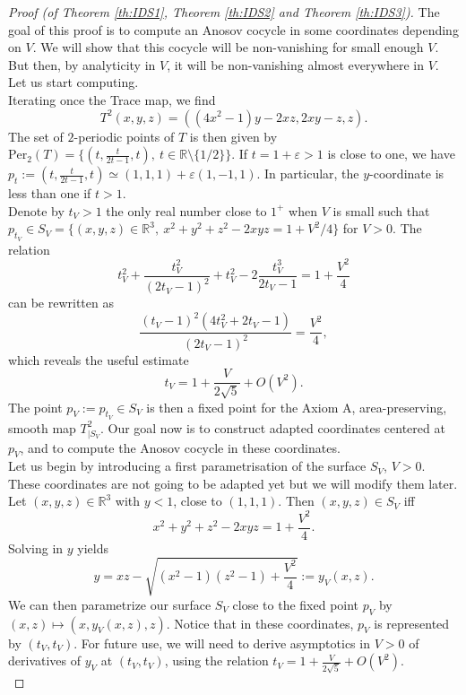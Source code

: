 \documentclass[10pt,a4paper]{amsart}
\begin{document}
\begin{proof}[Proof (of Theorem \ref{th:IDS1}, Theorem \ref{th:IDS2} and Theorem \ref{th:IDS3})] 
The goal of this proof is to compute an Anosov cocycle in some coordinates depending on $V$. We will show that this cocycle will be non-vanishing for small enough $V$. But then, by analyticity in $V$, it will be non-vanishing almost everywhere in $V$. Let us start computing.\\

Iterating once the Trace map, we find
$$ T^2(x,y,z) = ((4x^2-1)y-2xz,2xy-z,z). $$
The set of $2$-periodic points of $T$ is then given by $\text{Per}_2(T) = \{ (t,\frac{t}{2t-1},t), \ t \in \mathbb{R} \setminus \{ 1/2\} \}$. If $t = 1+\varepsilon > 1$ is close to one, we have $p_t := (t,\frac{t}{2t-1},t) \simeq (1,1,1) + \varepsilon(1,-1,1)$. In particular, the $y$-coordinate is less than one if $t>1$. \\

Denote by $t_V>1$ the only real number close to $1^+$ when $V$ is small such that $p_{t_V} \in S_V = \{ (x,y,z) \in \mathbb{R}^3, \  x^2+y^2+z^2 - 2xyz = 1 + V^2/4 \} $ for $V>0$. The relation 
$$ t_V^2 + \frac{t_V^2}{(2t_V-1)^2} +t_V^2 - 2 \frac{t_V^3}{2t_V-1} = 1+ \frac{V^2}{4} $$
can be rewritten as $$ \frac{(t_V-1)^2(4t_V^2+2t_V-1)}{(2t_V-1)^2} = \frac{V^2}{4}, $$
which reveals the useful estimate $$t_V = 1+\frac{V}{2\sqrt{5}} + O(V^2).$$
The point $p_V := p_{t_V} \in S_V$ is then a fixed point for the Axiom A, area-preserving, smooth map $T^2_{|S_V}$. Our goal now is to construct adapted coordinates centered at $p_V$, and to compute the Anosov cocycle in these coordinates.  \\

Let us begin by introducing a first parametrisation of the surface $S_V$, $V>0$. These coordinates are not going to be adapted yet but we will modify them later. Let $(x,y,z) \in \mathbb{R}^3$ with $y<1$, close to $(1,1,1)$. Then $(x,y,z) \in S_V$ iff $$x^2+y^2+z^2 - 2x y z = 1+\frac{V^2}{4}. $$
Solving in $y$ yields
$$ y = xz - \sqrt{(x^2-1)(z^2-1) + \frac{V^2}{4}} := y_V(x,z). $$
We can then parametrize our surface $S_V$ close to the fixed point $p_V$ by 
$(x,z) \mapsto (x,y_V(x,z),z)$.
Notice that in these coordinates, $p_V$ is represented by $(t_V,t_V)$. For future use, we will need to derive asymptotics in $V>0$ of derivatives of $y_V$ at $(t_V,t_V)$, using the relation $t_V = 1 + \frac{V}{2 \sqrt{5}} + O(V^2)$. \\


\end{proof}
\end{document}
